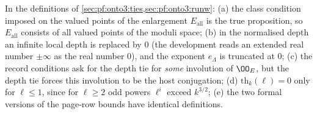 \begin{remark}\label{pf:onto3:rem:ties}
In the definitions of \cref{sec:pf:onto3:ties,sec:pf:onto3:runw}: (a) the class condition imposed on the valued points
of the enlargement $E_{\mathrm{all}}$ is the true proposition, so $E_{\mathrm{all}}$ consists of all valued points of the
moduli space; (b) in the normalised depth an infinite local depth is replaced by $0$ (the development reads an extended
real number $\pm\infty$ as the real number $0$), and the exponent $e_\Lambda$ is truncated at $0$; (c) the record
conditions ask for the depth tie for \emph{some} involution of $\OO_E$, but the depth tie forces this involution to be
the host conjugation; (d) $\mathrm{th}_k(\ell)=0$ only for $\ell\le1$, since for $\ell\ge2$ odd powers $\ell^i$ exceed
$k^{3/2}$; (e) the two formal versions of the page-row bounds have identical definitions.
\end{remark}
